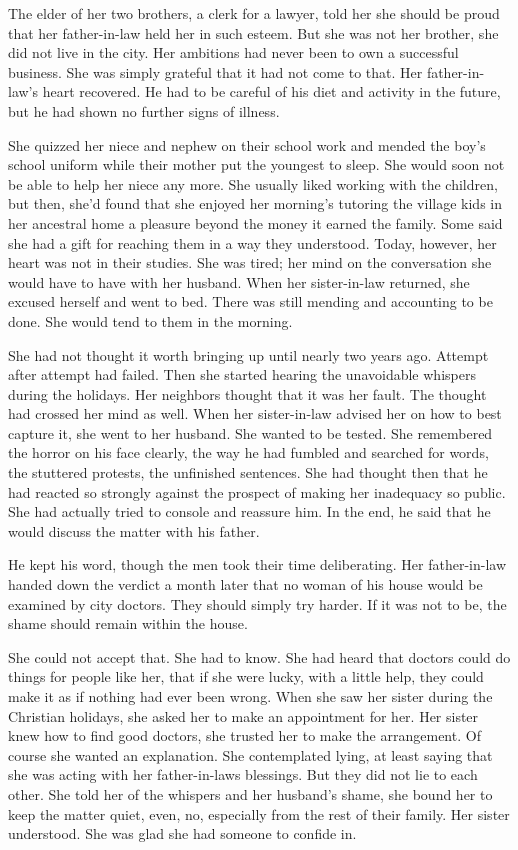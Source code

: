 \documentclass{article}
\begin{document}
The elder of her two brothers, a clerk for a lawyer, told her she should be proud that her father-in-law held her in such esteem. But she was not her brother, she did not live in the city. Her ambitions had never been to own a successful business. She was simply grateful that it had not come to that. Her father-in-law's heart recovered. He had to be careful of his diet and activity in the future, but he had shown no further signs of illness.

She quizzed her niece and nephew on their school work and mended the boy's school uniform while their mother put the youngest to sleep. She would soon not be able to help her niece any more. She usually liked working with the children, but then, she'd found that she enjoyed her morning's tutoring the village kids in her ancestral home a pleasure beyond the money it earned the family. Some said she had a gift for reaching them in a way they understood. Today, however, her heart was not in their studies. She was tired; her mind on the conversation she would have to have with her husband. When her sister-in-law returned, she excused herself and went to bed. There was still mending and accounting to be done. She would tend to them in the morning.

She had not thought it worth bringing up until nearly two years ago. Attempt after attempt had failed. Then she started hearing the unavoidable whispers during the holidays. Her neighbors thought that it was her fault. The thought had crossed her mind as well. When her sister-in-law advised her on how to best capture it, she went to her husband. She wanted to be tested. She remembered the horror on his face clearly, the way he had fumbled and searched for words, the stuttered protests, the unfinished sentences. She had thought then that he had reacted so strongly against the prospect of making her inadequacy so public. She had actually tried to console and reassure him. In the end, he said that he would discuss the matter with his father. 

He kept his word, though the men took their time deliberating. Her father-in-law handed down the verdict a month later that no woman of his house would be examined by city doctors. They should simply try harder. If it was not to be, the shame should remain within the house. 

She could not accept that. She had to know. She had heard that doctors could do things for people like her, that if she were lucky, with a little help, they  could make it as if nothing had ever been wrong. When she saw her sister during the Christian holidays, she asked her to make an appointment for her. Her sister knew how to find good doctors, she trusted her to make the arrangement. Of course she wanted an explanation. She contemplated lying, at least saying that she was acting with her father-in-laws blessings. But they did not lie to each other. She told her of the whispers and her husband's shame, she bound her to keep the matter quiet, even, no, especially from the rest of their family. Her sister understood. She was glad she had someone to confide in.
\end{document}
